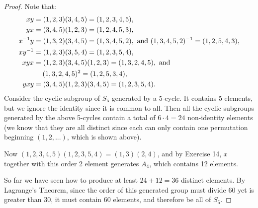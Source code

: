 \documentclass{article}
\begin{document}
\begin{enumerate}[label=(\alph*), itemsep=0em]
\begin{proof}
            Note that:
            \begin{align*}
                xy &= (1, 2, 3)(3, 4, 5) = (1, 2, 3, 4, 5), \\
                yx &= (3, 4, 5)(1, 2, 3) = (1, 2, 4, 5, 3), \\
                x^{-1}y &= (1, 3, 2)(3, 4, 5) = (1, 3, 4, 5, 2), \text{ and } (1, 3, 4, 5, 2)^{-1} = (1, 2, 5, 4, 3), \\
                xy^{-1} &= (1, 2, 3)(3, 5, 4) = (1, 2, 3, 5, 4), \\
                xyx &= (1, 2, 3)(3, 4, 5)(1, 2, 3) = (1, 3, 2, 4, 5), \text{ and } \\
                & \hspace{1.25em} (1, 3, 2, 4, 5)^2 = (1, 2, 5, 3, 4), \\
                yxy &= (3, 4, 5)(1, 2, 3)(3, 4, 5) = (1, 2, 3, 5, 4).
            \end{align*}
            Consider the cyclic subgroup of $S_5$ generated by a 5-cycle. It contains 5 elements, but we ignore the identity since it is common to all. Then all the cyclic subgroups generated by the above 5-cycles contain a total of $6 \cdot 4 = 24$ non-identity elements (we know that they are all distinct since each can only contain one permutation beginning $(1, 2, ...)$, which is shown above).

            Now $(1, 2, 3, 4, 5)(1, 2, 3, 5, 4) = (1, 3)(2, 4)$, and by Exercise 14, $x$ together with this order 2 element generates $A_4$, which contains 12 elements.

            So far we have seen how to produce at least $24 + 12 = 36$ distinct elements. By Lagrange's Theorem, since the order of this generated group must divide 60 yet is greater than 30, it must contain 60 elements, and therefore be all of $S_5$.
          \end{proof}
\end{enumerate}
\end{document}
